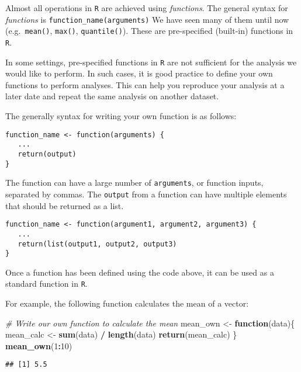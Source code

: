 \documentclass[
]{article}
\newenvironment{Shaded}{\begin{snugshade}}{\end{snugshade}}
\newcommand{\CommentTok}[1]{\textcolor[rgb]{0.56,0.35,0.01}{\textit{#1}}}
\newcommand{\ControlFlowTok}[1]{\textcolor[rgb]{0.13,0.29,0.53}{\textbf{#1}}}
\newcommand{\DecValTok}[1]{\textcolor[rgb]{0.00,0.00,0.81}{#1}}
\newcommand{\KeywordTok}[1]{\textcolor[rgb]{0.13,0.29,0.53}{\textbf{#1}}}
\newcommand{\NormalTok}[1]{#1}
\newcommand{\OperatorTok}[1]{\textcolor[rgb]{0.81,0.36,0.00}{\textbf{#1}}}
\newcommand{\StringTok}[1]{\textcolor[rgb]{0.31,0.60,0.02}{#1}}
\begin{document}
Almost all operations in \texttt{R} are achieved using \emph{functions}.
The general syntax for \emph{functions} is
\texttt{function\_name(arguments)} We have seen many of them until now
(e.g.~\texttt{mean()}, \texttt{max()}, \texttt{quantile()}). These are
pre-specified (built-in) functions in \texttt{R}.

In some settings, pre-specified functions in \texttt{R} are not
sufficient for the analysis we would like to perform. In such cases, it
is good practice to define your own functions to perform analyses. This
can help you reproduce your analysis at a later date and repeat the same
analysis on another dataset.

The generally syntax for writing your own function is as follows:

\begin{verbatim}
function_name <- function(arguments) {
   ...
   return(output)
}
\end{verbatim}

The function can have a large number of \texttt{arguments}, or function
inputs, separated by commas. The \texttt{output} from a function can
have multiple elements that should be returned as a list.

\begin{verbatim}
function_name <- function(argument1, argument2, argument3) {
   ...
   return(list(output1, output2, output3)
}
\end{verbatim}

Once a function has been defined using the code above, it can be used as
a standard function in \texttt{R}.

For example, the following function calculates the mean of a vector:

\begin{Shaded}
\begin{Highlighting}[]
\CommentTok{# Write our own function to calculate the mean}
\NormalTok{mean_own <-}\StringTok{ }\ControlFlowTok{function}\NormalTok{(data)\{}
\NormalTok{   mean_calc <-}\StringTok{ }\KeywordTok{sum}\NormalTok{(data) }\OperatorTok{/}\StringTok{ }\KeywordTok{length}\NormalTok{(data)}
   \KeywordTok{return}\NormalTok{(mean_calc)}
\NormalTok{\}}
\KeywordTok{mean_own}\NormalTok{(}\DecValTok{1}\OperatorTok{:}\DecValTok{10}\NormalTok{)}
\end{Highlighting}
\end{Shaded}

\begin{verbatim}
## [1] 5.5
\end{verbatim}
\end{document}
